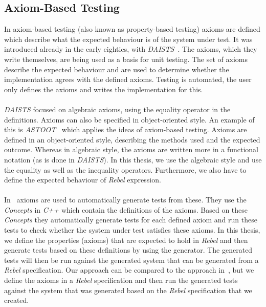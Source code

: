 \subsection{Axiom-Based Testing}
In axiom-based testing (also known as property-based testing) axioms are defined which describe what the expected behaviour is of the system under test. It was introduced already in the early eighties, with \textit{DAISTS}~\cite{gannon1981data}. The axioms, which they write themselves, are being used as a basis for unit testing. The set of axioms describe the expected behaviour and are used to determine whether the implementation agrees with the defined axioms. Testing is automated, the user only defines the axioms and writes the implementation for this.\\
\\
\textit{DAISTS} focused on algebraic axioms, using the equality operator in the definitions. Axioms can also be specified in object-oriented style. An example of this is \textit{ASTOOT}~\cite{doong1994astoot} which applies the ideas of axiom-based testing. Axioms are defined in an object-oriented style, describing the methods used and the expected outcome. Whereas in algebraic style, the axioms are written more in a functional notation (as is done in \textit{DAISTS}). In this thesis, we use the algebraic style and use the equality as well as the inequality operators. Furthermore, we also have to define the expected behaviour of \textit{Rebel} expression.\\
\\
In~\cite{bagge2010axioms} axioms are used to automatically generate tests from these. They use the \textit{Concepts} in \textit{C++} which contain the definitions of the axioms. Based on these \textit{Concepts} they automatically generate tests for each defined axiom and run these tests to check whether the system under test satisfies these axioms. In this thesis, we define the properties (axioms) that are expected to hold in \textit{Rebel} and then generate tests based on these definitions by using the generator. The generated tests will then be run against the generated system that can be generated from a \textit{Rebel} specification. Our approach can be compared to the approach in~\cite{bagge2010axioms}, but we define the axioms in a \textit{Rebel} specification and then run the generated tests against the system that was generated based on the \textit{Rebel} specification that we created.

